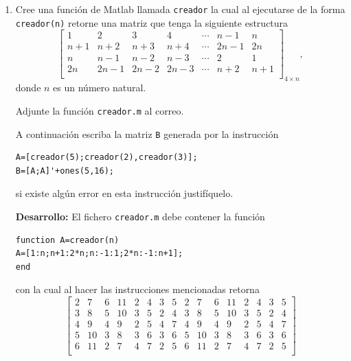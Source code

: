 \documentclass[11pt]{article}
\begin{document}
\begin{enumerate}
\begin{enumerate}
\vspace{1cm}
\item Cree una funci\'on de Matlab llamada \texttt{creador} la cual al ejecutarse de la forma \texttt{creador(n)} retorne una matriz que tenga la siguiente estructura
$$
\begin{bmatrix}
1 & 2 & 3 & 4 & \cdots & n-1 & n\\
n+1 & n+2 & n+3 & n+4 & \cdots & 2n-1 & 2n\\
n	& n-1 & n-2 & n-3 & \cdots & 2 & 1\\
2n	& 2n-1 & 2n-2 & 2n-3 & \cdots & n+2 & n+1\\
\end{bmatrix}_{4\times n},
$$
donde $n$ es un n\'umero natural. 

Adjunte la funci\'on \texttt{creador.m} al correo.

A continuaci\'on escriba la matriz \texttt{B} generada por la instrucción 
\begin{lstlisting}
A=[creador(5);creador(2),creador(3)];
B=[A;A]'+ones(5,16);
\end{lstlisting}
si existe algún error en esta instrucci\'on justifíquelo.

\vspace{5mm}

\textbf{Desarrollo:} El fichero \texttt{creador.m} debe contener la funci\'on 
\begin{lstlisting}
function A=creador(n)
A=[1:n;n+1:2*n;n:-1:1;2*n:-1:n+1];
end
\end{lstlisting}
con la cual al hacer las instrucciones mencionadas retorna
$$
\left[
\begin{array}{cccccccccccccccccccccccccccccc}
2 & 7 & 6 & 11 & 2 & 4 & 3 & 5 & 2 & 7 & 6 & 11 & 2 & 4 & 3 & 5  \\
3 & 8 & 5 & 10 & 3 & 5 & 2 & 4 & 3 & 8 & 5 & 10 & 3 & 5 & 2 & 4  \\
4 & 9 & 4 & 9 & 2 & 5 & 4 & 7 & 4 & 9 & 4 & 9 & 2 & 5 & 4 & 7  \\
5 & 10 & 3 & 8 & 3 & 6 & 3 & 6 & 5 & 10 & 3 & 8 & 3 & 6 & 3 & 6  \\
6 & 11 & 2 & 7 & 4 & 7 & 2 & 5 & 6 & 11 & 2 & 7 & 4 & 7 & 2 & 5  \\
\end{array}
\right]
$$

\end{enumerate}
\end{enumerate}
\end{document}
